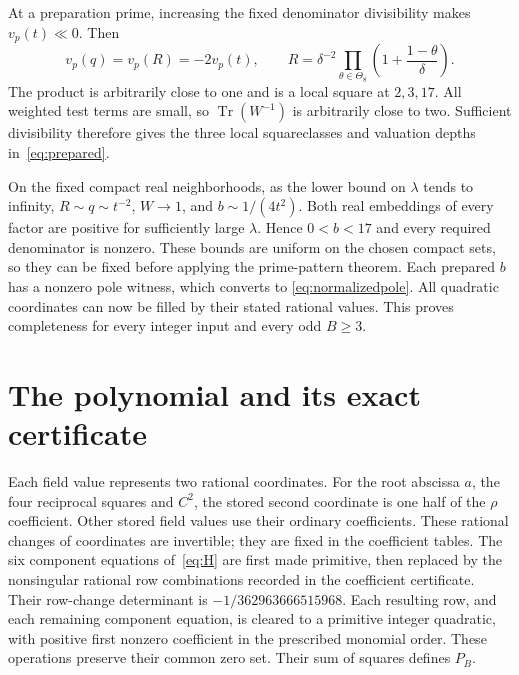 \documentclass[11pt,a4paper]{article}
\DeclareMathOperator{\Tr}{Tr}\DeclareMathOperator{\Nm}{N}
\begin{document}
At a preparation prime, increasing the fixed denominator divisibility
makes $v_p(t)\ll0$. Then
\[
 v_p(q)=v_p(R)=-2v_p(t),\qquad
 R=\delta^{-2}\prod_{\theta\in\Theta_8}
                   \left(1+\frac{1-\theta}{\delta}\right).
\]
The product is arbitrarily close to one and is a local square at
$2,3,17$. All weighted test terms are small, so $\Tr(W^{-1})$ is
arbitrarily close to two. Sufficient divisibility therefore gives the
three local squareclasses and valuation depths in~\eqref{eq:prepared}.

On the fixed compact real neighborhoods, as the lower bound on $\lambda$
tends to infinity, $R\sim q\sim t^{-2}$, $W\to1$, and
$b\sim1/(4t^2)$. Both real embeddings of every factor are positive
for sufficiently large $\lambda$. Hence $0<b<17$ and every required
denominator is nonzero. These bounds are uniform on the chosen compact
sets, so they can be fixed before applying the prime-pattern theorem.
Each prepared $b$ has a nonzero pole witness, which converts to
\eqref{eq:normalizedpole}. All quadratic coordinates can now be filled
by their stated rational values. This proves completeness for every
integer input and every odd $B\ge3$.

\section{The polynomial and its exact certificate}

Each field value represents two rational coordinates. For the root abscissa
$a$, the four reciprocal squares and $C^2$, the stored second
coordinate is one half of the $\rho$ coefficient. Other stored field
values use their ordinary coefficients. These rational changes of
coordinates are invertible; they are fixed in the coefficient tables.
The six component equations of~\eqref{eq:H} are first made primitive,
then replaced by the nonsingular rational row combinations recorded in
the coefficient certificate. Their row-change determinant is
$-1/362963666515968$. Each resulting row, and each remaining component
equation, is cleared to a primitive integer quadratic, with positive
first nonzero coefficient in the prescribed monomial order.
These operations preserve their common zero set. Their sum of squares
defines $P_B$.
\end{document}
